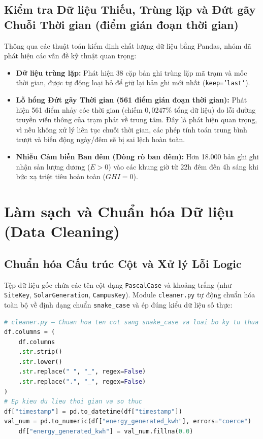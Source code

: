 \documentclass[12pt, a4paper]{report}
\begin{document}
\subsection{Kiểm tra Dữ liệu Thiếu, Trùng lặp và Đứt gãy Chuỗi Thời gian (điểm gián đoạn thời gian)}
Thông qua các thuật toán kiểm định chất lượng dữ liệu bằng Pandas, nhóm đã phát hiện các vấn đề kỹ thuật quan trọng:
\begin{itemize}[noitemsep]
    \item \textbf{Dữ liệu trùng lặp:} Phát hiện 38 cặp bản ghi trùng lặp mã trạm và mốc thời gian, được tự động loại bỏ để giữ lại bản ghi mới nhất (\texttt{keep='last'}).
    \item \textbf{Lỗ hổng Đứt gãy Thời gian (561 điểm gián đoạn thời gian):} Phát hiện 561 điểm nhảy cóc thời gian (chiếm $0{,}0247\%$ tổng dữ liệu) do lỗi đường truyền viễn thông của trạm phát về trung tâm. Đây là phát hiện quan trọng, vì nếu không xử lý liên tục chuỗi thời gian, các phép tính toán trung bình trượt và biến động ngày/đêm sẽ bị sai lệch hoàn toàn.
    \item \textbf{Nhiễu Cảm biến Ban đêm (Dòng rò ban đêm):} Hơn 18.000 bản ghi ghi nhận sản lượng dương ($E > 0$) vào các khung giờ từ 22h đêm đến 4h sáng khi bức xạ triệt tiêu hoàn toàn ($GHI = 0$).
\end{itemize}

\section{Làm sạch và Chuẩn hóa Dữ liệu (Data Cleaning)}
\label{sec:data_cleaning}

\subsection{Chuẩn hóa Cấu trúc Cột và Xử lý Lỗi Logic}
Tệp dữ liệu gốc chứa các tên cột dạng \texttt{PascalCase} và khoảng trắng (như \texttt{SiteKey}, \texttt{SolarGeneration}, \texttt{CampusKey}). Module \texttt{cleaner.py} tự động chuẩn hóa toàn bộ về định dạng chuẩn \texttt{snake\_case} và ép đúng kiểu dữ liệu số thực:

\begin{lstlisting}[language=Python, caption={Đoạn mã Python chuẩn hóa cấu trúc cột sang snake\_case}, label={lst:clean_columns}]
# cleaner.py — Chuan hoa ten cot sang snake_case va loai bo ky tu thua
df.columns = (
    df.columns
    .str.strip()
    .str.lower()
    .str.replace(" ", "_", regex=False)
    .str.replace(".", "_", regex=False)
)
# Ep kieu du lieu thoi gian va so thuc
df["timestamp"] = pd.to_datetime(df["timestamp"])
val_num = pd.to_numeric(df["energy_generated_kwh"], errors="coerce")
    df["energy_generated_kwh"] = val_num.fillna(0.0)
\end{lstlisting}
\end{document}
